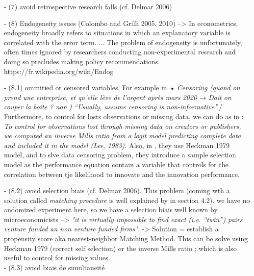 \begin{itemize}
\begin{itemize}
- (7) avoid retrospective research falls (cf. Delmar 2006)\newline

- (8) Endogeneity issues (Colombo and Grilli 2005, 2010) --> In econometrics, endogeneity broadly refers to situations in which an explanatory variable is correlated with the error term. ... The problem of endogeneity is unfortunately, often times ignored by researchers conducting non-experimental research and doing so precludes making policy recommendations. https://fr.wikipedia.org/wiki/Endog%

- (8.1) ommitied or censored variables. For example in \citep{beckman2007early} \textit{•	Censoring (quand on prend une entreprise, et qu’elle lève de l’argent après mars 2020 → Doit on couper la boite ? non.) “Usually, assume censoring is non-informative”.}\newline/ Furthermore, to control for losts observations or missing data, we can do as in \citet{taylor2006superman} : \textit{To control for observations lost through missing data on creators or publishers, we computed an inverse Mills ratio from a logit model predicting complete data and included it in the model (Lee, 1983).}
Also, in \citet{andries2014small}, they use Heckman 1979 model, and to slve data censoring problem, they introduce  a sample selection model as the performance equation contain a variable that controls for the correlation between tje likelihood to innovate and the innovation performance.

- (8.2) avoid selection biais (cf. Delmar 2006). This problem (coming wth a solution called \textit{matching procedure} is well explained by \citep{engel2007firm} in section 4.2). we have no andomized experiment here, so we have a selection biais well known by microeconomicists --> \textit{"it is virtually impossible to find exact (i.e. “twin”) pairs venture funded an non venture funded firms".} -> Solution = establish a propensity score aka nearest-neighbor Matching Method. This can be solve using Heckman 1979 (correct self selection) or the inverse Mills ratio ; which is also useful to control for missing values.\\

- (8.3) avoid biais de simultaneité\newline


\end{itemize}
\end{itemize}
